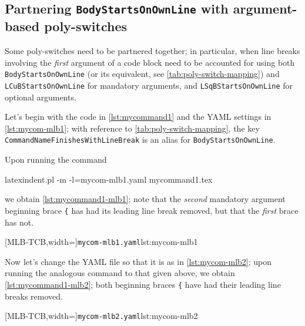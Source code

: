 \subsection{Partnering \texttt{BodyStartsOnOwnLine} with argument-based poly-switches}
	Some poly-switches need to be partnered together; in particular, when line breaks involving the \emph{first} argument of a code block need to be accounted for using both \texttt{BodyStartsOnOwnLine} (or its equivalent, see \vref{tab:poly-switch-mapping}) and \texttt{LCuBStartsOnOwnLine} for mandatory arguments, and \texttt{LSqBStartsOnOwnLine} for optional arguments.

	Let's begin with the code in \cref{lst:mycommand1} and the YAML settings in \cref{lst:mycom-mlb1}; with reference to \vref{tab:poly-switch-mapping}, the key \texttt{CommandNameFinishesWithLineBreak} is an alias for \texttt{BodyStartsOnOwnLine}.


	Upon running the command \begin{commandshell}
latexindent.pl -m -l=mycom-mlb1.yaml mycommand1.tex
\end{commandshell} we obtain \cref{lst:mycommand1-mlb1}; note that the \emph{second} mandatory argument beginning brace \lstinline!{! has had its leading line break removed, but that the \emph{first} brace has not.

	\begin{minipage}{.4\linewidth}
	\end{minipage}
	\hfill
	\begin{minipage}{.55\linewidth}
		[MLB-TCB,width=\linewidth]{\texttt{mycom-mlb1.yaml}}{lst:mycom-mlb1}
	\end{minipage}

	Now let's change the YAML file so that it is as in \cref{lst:mycom-mlb2}; upon running the analogous command to that given above, we obtain \cref{lst:mycommand1-mlb2}; both beginning braces \lstinline!{! have had their leading line breaks removed.

	\begin{minipage}{.4\linewidth}
	\end{minipage}
	\hfill
	\begin{minipage}{.55\linewidth}
		[MLB-TCB,width=\linewidth]{\texttt{mycom-mlb2.yaml}}{lst:mycom-mlb2}
	\end{minipage}

